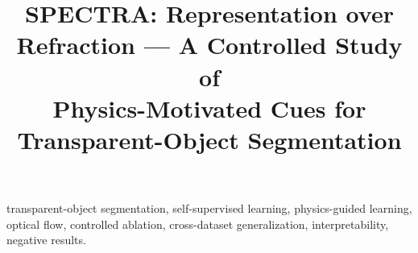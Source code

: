 \documentclass[conference]{IEEEtran}
\begin{document}
\title{SPECTRA: Representation over Refraction --- A Controlled Study of\\
Physics-Motivated Cues for Transparent-Object Segmentation}

\author{
}

\maketitle



\begin{IEEEkeywords}
transparent-object segmentation, self-supervised learning, physics-guided
learning, optical flow, controlled ablation, cross-dataset generalization,
interpretability, negative results.
\end{IEEEkeywords}
























\end{document}
